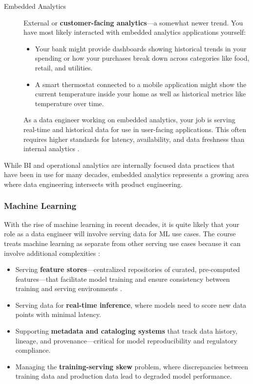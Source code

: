 \documentclass{article}
\begin{document}
\begin{description}
    \item[Embedded Analytics] External or \textbf{customer-facing analytics}---a somewhat newer trend. You have most likely interacted with embedded analytics applications yourself:
    \begin{itemize}
        \item Your bank might provide dashboards showing historical trends in your spending or how your purchases break down across categories like food, retail, and utilities.
        \item A smart thermostat connected to a mobile application might show the current temperature inside your home as well as historical metrics like temperature over time.
    \end{itemize}
    As a data engineer working on embedded analytics, your job is serving real-time and historical data for use in user-facing applications. This often requires higher standards for latency, availability, and data freshness than internal analytics \cite{reis2022fundamentals}.
\end{description}

While BI and operational analytics are internally focused data practices that have been in use for many decades, embedded analytics represents a growing area where data engineering intersects with product engineering.

\subsubsection{Machine Learning}
With the rise of machine learning in recent decades, it is quite likely that your role as a data engineer will involve serving data for ML use cases. The course treats machine learning as separate from other serving use cases because it can involve additional complexities \cite{reis2022fundamentals}:
\begin{itemize}
    \item Serving \textbf{feature stores}---centralized repositories of curated, pre-computed features---that facilitate model training and ensure consistency between training and serving environments \cite{breck2019data}.
    \item Serving data for \textbf{real-time inference}, where models need to score new data points with minimal latency.
    \item Supporting \textbf{metadata and cataloging systems} that track data history, lineage, and provenance---critical for model reproducibility and regulatory compliance.
    \item Managing the \textbf{training-serving skew} problem, where discrepancies between training data and production data lead to degraded model performance.
\end{itemize}
\end{document}
